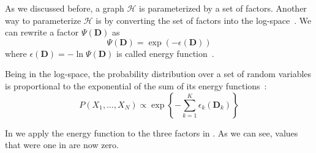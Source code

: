 \bigskip

As we discussed before, a graph $\mathcal{H}$ is parameterized by a set of \glspl{factor}.
Another way to parameterize $\mathcal{H}$ is by converting the set of \glspl{factor} into the log-space~\citep{koller2009probabilistic}.
We can rewrite a factor $\Psi(\mathbf{D})$ as
\begin{equation*}
  \label{equ:energy-function}
  \Psi(\mathbf{D}) = \exp(-\epsilon(\mathbf{D}))
\end{equation*}
where $\epsilon(\mathbf{D})=-\ln\Psi(\mathbf{D})$ is called \gls{energy function}~\citep{koller2009probabilistic}.

Being in the log-space, the \gls{probability distribution} over a set of \glspl{random variable} is proportional to the exponential of the sum of its energy functions~\citep{koller2009probabilistic}:
\begin{equation}
  \label{equ:p-energy-function}
  P\left(X_1,\dots,X_N\right) \propto \exp\left\{-\sum_{k=1}^K\epsilon_k\left(\mathbf{D}_k\right)\right\}
\end{equation}

In  we apply the \gls{energy function} to the three factors in .
As we can see, values that were one in  are now zero.

